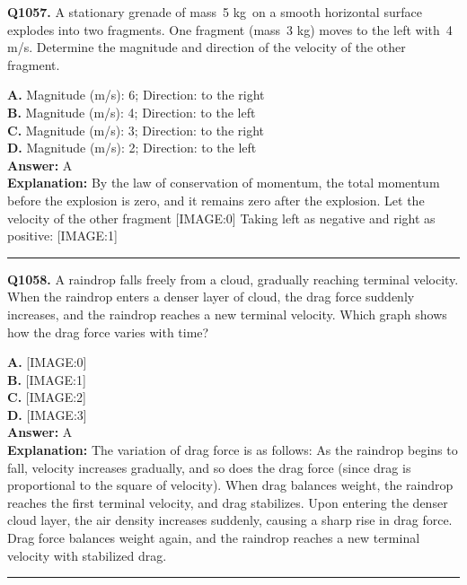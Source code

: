 \documentclass[12pt]{article}
\begin{document}
\noindent
\textbf{Q1057.} A stationary grenade of mass 5
kg on a smooth horizontal surface explodes into two fragments. One fragment (mass 3
kg) moves to the left with 4
m/s. Determine the magnitude and direction of the velocity of the other fragment.



\textbf{A.} Magnitude (m/s): 6; Direction: to the right \\
\textbf{B.} Magnitude (m/s): 4; Direction: to the left \\
\textbf{C.} Magnitude (m/s): 3; Direction: to the right \\
\textbf{D.} Magnitude (m/s): 2; Direction: to the left \\

\textbf{Answer:} A \\
\textbf{Explanation:} By the law of conservation of momentum, the total momentum before the explosion is zero, and it remains zero after the explosion.
Let the velocity of the other fragment
[IMAGE:0]
Taking left as negative and right as positive:
[IMAGE:1]

\hrule
\vspace{1em}


\noindent
\textbf{Q1058.} A raindrop falls freely from a cloud, gradually reaching terminal velocity. When the raindrop enters a denser layer of cloud, the drag force suddenly increases, and the raindrop reaches a new terminal velocity. Which graph shows how the drag force varies with time?



\textbf{A.} [IMAGE:0] \\
\textbf{B.} [IMAGE:1] \\
\textbf{C.} [IMAGE:2] \\
\textbf{D.} [IMAGE:3] \\

\textbf{Answer:} A \\
\textbf{Explanation:} The variation of drag force is as follows:
As the raindrop begins to fall, velocity increases gradually, and so does the drag force (since drag is proportional to the square of velocity).
When drag balances weight, the raindrop reaches the first terminal velocity, and drag stabilizes.
Upon entering the denser cloud layer, the air density increases suddenly, causing a sharp rise in drag force.
Drag force balances weight again, and the raindrop reaches a new terminal velocity with stabilized drag.

\hrule
\vspace{1em}
\end{document}
